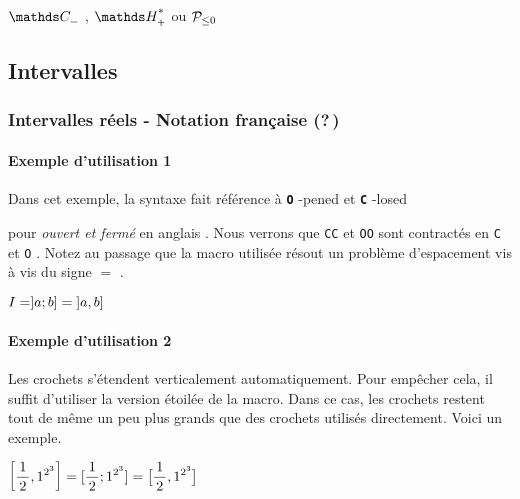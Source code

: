 \documentclass[12pt,a4paper]{article}
\theoremstyle{definition}
\newcommand\whyprefix[2]{%
	\textbf{\prefix{#1}}-#2%
}
\newcommand\prefix[1]{%
	\texttt{#1}%
}
\newcommand\inenglish[1]{%
	\emph{\og #1 \fg} en anglais%
}
\begin{document}
\begin{latexex}
$\setspecial{\CC}{n}$ ,
$\setspecial{\HH}{sp}$ ou
$\setspecial*{\setproba{P}}{n}$
\end{latexex}



\subsection{Intervalles}

\subsubsection{Intervalles réels - Notation française (?\,)}

\paragraph{Exemple d'utilisation 1}

Dans cet exemple, la syntaxe fait référence à 
\whyprefix{O}{pened} et \whyprefix{C}{losed}
pour
\inenglish{ouvert et fermé}.
Nous verrons que \prefix{CC} et \prefix{OO} sont contractés en \prefix{C} et \prefix{O}.
Notez au passage que la macro utilisée résout un problème d'espacement vis à vis du signe $=$ .

\begin{latexex}
$I = ]a ; b] = \intervalOC{a}{b}$
\end{latexex}




\paragraph{Exemple d'utilisation 2}

Les crochets s'étendent verticalement automatiquement. Pour empêcher cela, il suffit d'utiliser la version étoilée de la macro.
Dans ce cas, les crochets restent tout de même un peu plus grands que des crochets utilisés directement. Voici un exemple.

\begin{latexex}
$\displaystyle
 \intervalC{ \frac{1}{2} }{ 1^{2^{3}} }
 =
 [ \frac{1}{2} ; 1^{2^{3}} ]
 =
 \intervalC*{ \frac{1}{2} }{ 1^{2^{3}} }$
\end{latexex}
\end{document}
